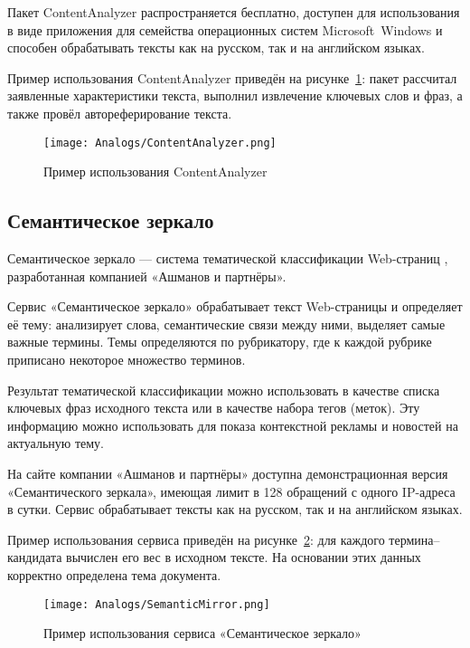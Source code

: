 Пакет ContentAnalyzer распространяется бесплатно, доступен для
использования в виде приложения для семейства операционных систем
Microsoft\textregistered~Windows\textregistered
и способен обрабатывать тексты как на русском, так и на
английском языках.

Пример использования ContentAnalyzer приведён на
рисунке~\ref{fig:Analogs:ContentAnalyzer}: пакет рассчитал
заявленные характеристики текста, выполнил извлечение ключевых
слов и фраз, а также провёл автореферирование текста.

\begin{landscape}
\begin{figure}[ht]
  \centering
  \texttt{[image: Analogs/ContentAnalyzer.png]}
  \caption{Пример использования ContentAnalyzer}
  \label{fig:Analogs:ContentAnalyzer}
\end{figure}
\end{landscape}

\subsection{Семантическое зеркало}
\label{subsec:SemanticMirror}
Семантическое зеркало — система тематической классификации
Web-страниц \cite{SemanticMirror}, разработанная компанией
«Ашманов и партнёры».

Сервис «Семантическое зеркало» обрабатывает текст Web-страницы и
определяет её тему: анализирует слова, семантические связи между
ними, выделяет самые важные термины. Темы определяются по
рубрикатору, где к каждой рубрике приписано некоторое множество
терминов.

Результат тематической классификации можно использовать в качестве
списка ключевых фраз исходного текста или в качестве набора тегов
(меток). Эту информацию можно использовать для показа контекстной
рекламы и новостей на актуальную тему.

На сайте компании «Ашманов и партнёры» доступна демонстрационная
версия «Семантического зеркала», имеющая лимит в 128 обращений с
одного IP-адреса в сутки. Сервис обрабатывает тексты как на русском,
так и на английском языках.

Пример использования сервиса приведён на
рисунке~\ref{fig:Analogs:SemanticMirror}: для каждого
термина--кандидата вычислен его вес в исходном тексте. На основании
этих данных корректно определена тема документа.

\begin{landscape}
\begin{figure}[ht]
  \centering
  \texttt{[image: Analogs/SemanticMirror.png]}
  \caption{Пример использования сервиса «Семантическое зеркало»}
  \label{fig:Analogs:SemanticMirror}
\end{figure}
\end{landscape}

